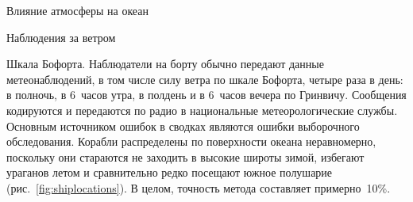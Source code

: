 \begin{chapter}{Влияние атмосферы на океан}
\begin{section}{Наблюдения за ветром}
\begin{paragraph}{Шкала Бофорта.}
Наблюдатели на борту обычно передают данные метеонаблюдений, в том
числе силу ветра по шкале Бофорта, четыре раза в день: в полночь, в
6~часов утра, в полдень и в 6~часов вечера по Гринвичу. Сообщения
кодируются и передаются по радио в национальные метеорологические
службы. Основным источником ошибок в сводках являются ошибки выборочного 
обследования. Корабли распределены по поверхности океана неравномерно, 
поскольку они стараются не заходить в высокие широты зимой, избегают ураганов
летом и сравнительно редко посещают южное полушарие 
(рис.~\ref{fig:shiplocations}). В целом,
точность метода составляет примерно~10\%.
%


\end{paragraph}
\end{section}
\end{chapter}
